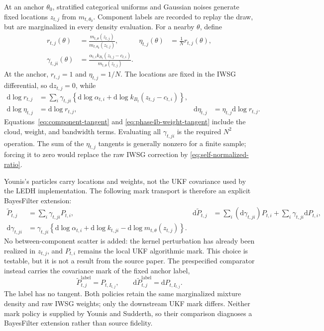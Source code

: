 \documentclass[11pt]{article}
\newcommand{\dd}{\mathrm{d}}
\begin{document}
At an anchor $\theta_0$, stratified categorical uniforms and Gaussian noises
generate fixed locations $z_{t,j}$ from $m_{t,\theta_0}$.  Component labels are
recorded to replay the draw, but are marginalized in every density evaluation.
For a nearby $\theta$, define
\begin{align}
 r_{t,j}(\theta)
   &=\frac{m_{t,\theta}(z_{t,j})}
           {m_{t,\theta_0}(z_{t,j})}, &
 \eta_{t,j}(\theta)
   &=\frac{1}{N}r_{t,j}(\theta),
 \label{eq:phase4b-iwsg-weights}\\
 \gamma_{t,ji}(\theta)
   &=\frac{\alpha_{t,i}k_{B_t}(z_{t,j}-c_{t,i})}
           {m_{t,\theta}(z_{t,j})}. &&
 \label{eq:phase4b-responsibilities}
\end{align}
At the anchor, $r_{t,j}=1$ and $\eta_{t,j}=1/N$.  The locations are fixed in the IWSG
differential, so $\dd z_{t,j}=0$, while
\begin{align}
 \dd\log r_{t,j}
   &=\sum_i\gamma_{t,ji}
      \left\{\dd\log\alpha_{t,i}
             +\dd\log k_{B_t}(z_{t,j}-c_{t,i})\right\},\\
 \dd\log\eta_{t,j}&=\dd\log r_{t,j}, &
 \dd\eta_{t,j}&=\eta_{t,j}\dd\log r_{t,j}.
 \label{eq:phase4b-weight-tangent}
\end{align}
Equations~\eqref{eq:component-tangent} and
\eqref{eq:phase4b-weight-tangent} include the cloud, weight, and bandwidth
terms.  Evaluating all $\gamma_{t,ji}$ is the required $N^2$ operation.  The
sum of the $\eta_{t,j}$ tangents is generally nonzero for a finite sample;
forcing it to zero would replace the raw IWSG correction by
\eqref{eq:self-normalized-ratio}.

Younis's particles carry locations and weights, not the UKF covariance used by
the LEDH implementation.  The following mark transport is therefore an
explicit BayesFilter extension:
\begin{align}
 \widetilde P_{t,j}
   &=\sum_i\gamma_{t,ji}P_{t,i}, &
 \dd\widetilde P_{t,j}
   &=\sum_i(\dd\gamma_{t,ji})P_{t,i}
     +\sum_i\gamma_{t,ji}\dd P_{t,i},\\
 \dd\gamma_{t,ji}
   &=\gamma_{t,ji}\left\{
       \dd\log\alpha_{t,i}+\dd\log k_{t,ji}
       -\dd\log m_{t,\theta}(z_{t,j})\right\}.
 \label{eq:phase4b-covariance-mark}
\end{align}
No between-component scatter is added: the kernel perturbation has already
been realized in $z_{t,j}$, and $P_{t,i}$ remains the local UKF algorithmic
mark.  This choice is testable, but it is not a result from the source paper.
The prespecified comparator instead carries the covariance mark of the fixed
anchor label,
\begin{equation}
 \widetilde P_{t,j}^{\mathrm{label}}=P_{t,I_{t,j}},\qquad
 \dd\widetilde P_{t,j}^{\mathrm{label}}=\dd P_{t,I_{t,j}}.
 \label{eq:phase4b-selected-mark}
\end{equation}
The label has no tangent.  Both policies retain the same marginalized mixture
density and raw IWSG weights; only the downstream UKF mark differs.  Neither
mark policy is supplied by Younis and Sudderth, so their comparison diagnoses a
BayesFilter extension rather than source fidelity.
\end{document}
